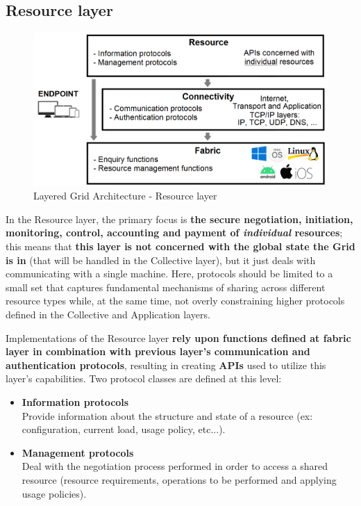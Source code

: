 \subsection{Resource layer}
\begin{figure}[!ht]
    \centering
    \includegraphics[scale=0.35]{document/chapters/chapter_2/images/resource_layer.png}
    \caption{Layered Grid Architecture - Resource layer}
    \label{fig:resource_layer}
\end{figure}

\noindent In the Resource layer, the primary focus is \textbf{the secure negotiation, initiation, monitoring, control, accounting and payment of \textit{individual} resources}; this means that \textbf{this layer is not concerned with the global state the Grid is in} (that will be handled in the Collective layer), but it just deals with communicating with a single machine. Here, protocols should be limited to a small set that captures fundamental mechanisms of sharing across different resource types while, at the same time, not overly constraining higher protocols defined in the Collective and Application layers.

Implementations of the Resource layer \textbf{rely upon functions defined at fabric layer in combination with previous layer's communication and authentication protocols}, resulting in creating \textbf{APIs} used to utilize this layer's capabilities.
Two protocol classes are defined at this level:
\begin{itemize}
    \item \textbf{Information protocols}\\
    Provide information about the structure and state of a resource (ex: configuration, current load, usage policy, etc...).
    \item \textbf{Management protocols}\\
    Deal with the negotiation process performed in order to access a shared resource (resource requirements, operations to be performed and applying usage policies).
\end{itemize} 


